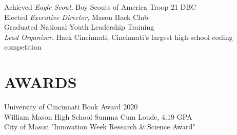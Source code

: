 \documentclass[margin]{res} %
\begin{document}
\begin{resume}
Achieved {\it Eagle Scout}, Boy Scouts of America Troop 21 DBC \\
Elected {\it Executive Director}, Mason Hack Club \\
Graduated National Youth Leadership Training \\
{\it Lead Organizer}, Hack Cincinnati, Cincinnati's largest high-school coding competition


\section{AWARDS}

University of Cincinnati Book Award 2020 \\
William Mason High School Summa Cum Loude, 4.19 GPA \\
City of Mason "Innovation Week Research \& Science Award"


\end{resume}
\end{document}

